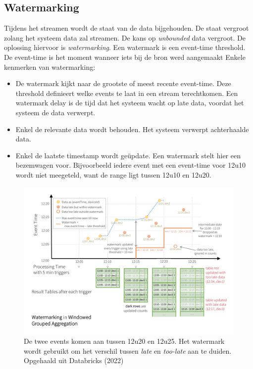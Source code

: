 \documentclass[a4paper,10pt,twoside]{report}
\begin{document}
\newpage

\subsection{Watermarking}

Tijdens het streamen wordt de staat van de data bijgehouden. De staat vergroot zolang het systeem data zal streamen. De kans op \textit{unbounded} data vergroot. De oplossing hiervoor is \textit{watermarking}. Een watermark is een event-time threshold. De event-time is het moment wanneer iets bij de bron werd aangemaakt Enkele kenmerken van watermarking:
\begin{itemize}
\item De watermark kijkt naar de grootste of meest recente event-time. Deze threshold definieert welke events te laat in een stream terechtkomen. Een watermark delay is de tijd dat het systeem wacht op late data, voordat het systeem de data verwerpt.
\item Enkel de relevante data wordt behouden. Het systeem verwerpt achterhaalde data.
\item Enkel de laatste timestamp wordt geüpdate. Een watermark stelt hier een bezemwagen voor. Bijvoorbeeld iedere event met een event-time voor 12u10 wordt niet meegeteld, want de range ligt tussen 12u10 en 12u20.
\end{itemize}

\begin{figure}
\includegraphics[width=\linewidth]{images/watermarking-in-windowed-grouped-aggregation.png}
\caption{De twee events komen aan tussen 12u20 en 12u25. Het watermark wordt gebruikt om het verschil tussen \textit{late} en \textit{too-late} aan te duiden. Opgehaald uit Databricks (2022)}
\end{figure}
\end{document}
